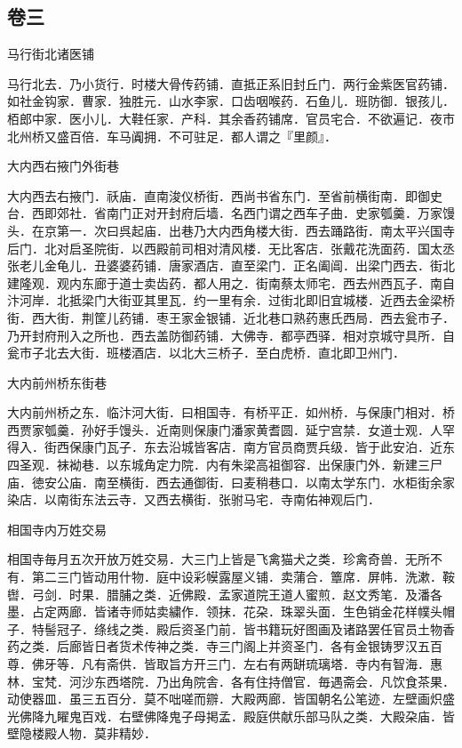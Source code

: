 \documentclass[]{article}
\begin{document}
\hypertarget{header-n44}{%
\subsection{卷三}\label{header-n44}}

马行街北诸医铺

马行北去．乃小货行．时楼大骨传药铺．直抵正系旧封丘门．两行金紫医官药铺．如社金钩家．曹家．独胜元．山水李家．口齿咽喉药．石鱼儿．班防御．银孩儿．栢郎中家．医小儿．大鞋任家．产科．其余香药铺席．官员宅合．不欲遍记．夜市北州桥又盛百倍．车马阗拥．不可驻足．都人谓之『里颜』．

大内西右掖门外街巷

大内西去右掖门．祅庙．直南浚仪桥街．西尚书省东门．至省前横街南．即御史台．西即郊社．省南门正对开封府后墙．名西门谓之西车子曲．史家瓠羹．万家馒头．在京第一．次曰呉起庙．出巷乃大内西角楼大街．西去踊路街．南太平兴国寺后门．北对启圣院街．以西殿前司相对清风楼．无比客店．张戴花洗面药．国太丞张老儿金龟儿．丑婆婆药铺．唐家酒店．直至梁门．正名阖阊．出梁门西去．街北建隆观．观内东廊于道士卖齿药．都人用之．街南蔡太师宅．西去州西瓦子．南自汴河岸．北抵梁门大街亚其里瓦．约一里有余．过街北即旧宜城楼．近西去金梁桥街．西大街．荆筐儿药铺．枣王家金银铺．近北巷口熟药惠氏西局．西去瓮市子．乃开封府刑入之所也．西去盖防御药铺．大佛寺．都亭西驿．相对京城守具所．自瓮市子北去大街．班楼酒店．以北大三桥子．至白虎桥．直北即卫州门．

大内前州桥东街巷

大内前州桥之东．临汴河大街．曰相国寺．有桥平正．如州桥．与保康门相对．桥西贾家瓠羹．孙好手馒头．近南则保康门潘家黄耆圆．延宁宫禁．女道士观．人罕得入．街西保康门瓦子．东去沿城皆客店．南方官员商贾兵级．皆于此安泊．近东四圣观．袜袎巷．以东城角定力院．内有朱梁高祖御容．出保康门外．新建三尸庙．徳安公庙．南至横街．西去通御街．曰麦稍巷口．以南太学东门．水柜街余家染店．以南街东法云寺．又西去横街．张驸马宅．寺南佑神观后门．

相国寺内万姓交易

相国寺毎月五次开放万姓交易．大三门上皆是飞禽猫犬之类．珍禽奇兽．无所不有．第二三门皆动用什物．庭中设彩幙露屋义铺．卖蒲合．簟席．屏帏．洗漱．鞍辔．弓剑．时果．腊脯之类．近佛殿．孟家道院王道人蜜煎．赵文秀笔．及潘各墨．占定两廊．皆诸寺师姑卖繍作．领抹．花朶．珠翠头面．生色销金花样幞头帽子．特髻冠子．绦线之类．殿后资圣门前．皆书籍玩好图画及诸路罢任官员土物香药之类．后廊皆日者货术传神之类．寺三门阁上并资圣门．各有金银铸罗汉五百尊．佛牙等．凡有斋供．皆取旨方开三门．左右有两缾琉璃塔．寺内有智海．惠林．宝梵．河沙东西塔院．乃出角院舎．各有住持僧官．毎遇斋会．凡饮食茶果．动使器皿．虽三五百分．莫不咄嗟而辧．大殿两廊．皆国朝名公笔迹．左壁画炽盛光佛降九矅鬼百戏．右壁佛降鬼子母掲孟．殿庭供献乐部马队之类．大殿朶庙．皆壁隐楼殿人物．莫非精妙．
\end{document}
